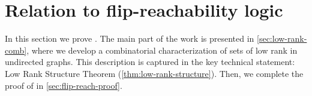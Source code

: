 \section{Relation to flip-reachability logic}\label{sec:freach}


In this section we prove . The main part of the work is presented in \cref{sec:low-rank-comb}, where we develop a combinatorial characterization of sets of low rank in undirected graphs. This description is captured in the key technical statement: Low Rank Structure Theorem (\cref{thm:low-rank-structure}). Then, we complete the proof of  in \cref{sec:flip-reach-proof}.




